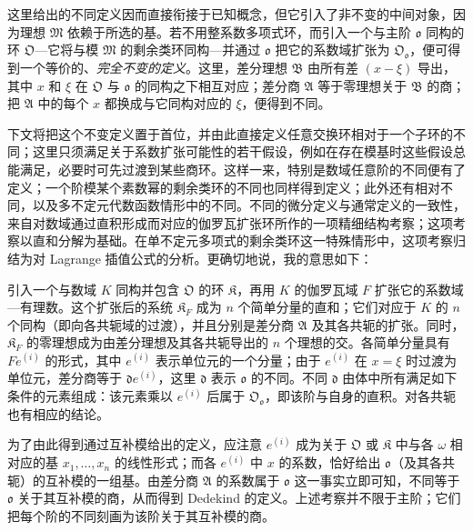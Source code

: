 这里给出的不同定义因而直接衔接于已知概念，但它引入了非不变的中间对象，因为理想 \(\mathfrak M\) 依赖于所选的基。若不用整系数多项式环，而引入一个与主阶 \(\mathfrak o\) 同构的环 \(\mathfrak O\)---它将与模 \(\mathfrak M\) 的剩余类环同构---并通过 \(\mathfrak o\) 把它的系数域扩张为 \(\mathfrak O_{\mathfrak o}\)，便可得到一个等价的、\emph{完全不变的定义}。这里，差分理想 \(\mathfrak B\) 由所有差 \((x-\xi)\) 导出，其中 \(x\) 和 \(\xi\) 在 \(\mathfrak O\) 与 \(\mathfrak o\) 的同构之下相互对应；差分商 \(\mathfrak A\) 等于零理想关于 \(\mathfrak B\) 的商；把 \(\mathfrak A\) 中的每个 \(x\) 都换成与它同构对应的 \(\xi\)，便得到不同。

下文将把这个不变定义置于首位，并由此直接定义任意交换环相对于一个子环的不同；这里只须满足关于系数扩张可能性的若干假设，例如在存在模基时这些假设总能满足，必要时可先过渡到某些商环。这样一来，特别是数域任意阶的不同便有了定义；一个阶模某个素数幂的剩余类环的不同也同样得到定义；此外还有相对不同，以及多不定元代数函数情形中的不同。不同的微分定义与通常定义的一致性，来自对数域通过直积形成而对应的伽罗瓦扩张环所作的一项精细结构考察；这项考察以直和分解为基础。在单不定元多项式的剩余类环这一特殊情形中，这项考察归结为对 Lagrange 插值公式的分析。更确切地说，我的意思如下：

引入一个与数域 \(K\) 同构并包含 \(\mathfrak O\) 的环 \(\mathfrak K\)，再用 \(K\) 的伽罗瓦域 \(F\) 扩张它的系数域---有理数。这个扩张后的系统 \(\mathfrak K_F\) 成为 \(n\) 个简单分量的直和；它们对应于 \(K\) 的 \(n\) 个同构（即向各共轭域的过渡），并且分别是差分商 \(\mathfrak A\) 及其各共轭的扩张。同时，\(\mathfrak K_F\) 的零理想成为由差分理想及其各共轭导出的 \(n\) 个理想的交。各简单分量具有 \(Fe^{(i)}\) 的形式，其中 \(e^{(i)}\) 表示单位元的一个分量；由于 \(e^{(i)}\) 在 \(x=\xi\) 时过渡为单位元，差分商等于 \(\mathfrak d e^{(i)}\)，这里 \(\mathfrak d\) 表示 \(\mathfrak o\) 的不同。不同 \(\mathfrak d\) 由体中所有满足如下条件的元素组成：该元素乘以 \(e^{(i)}\) 后属于 \(\mathfrak O_{\mathfrak o}\)，即该阶与自身的直积。对各共轭也有相应的结论。

为了由此得到通过互补模给出的定义，应注意 \(e^{(i)}\) 成为关于 \(\mathfrak O\) 或 \(\mathfrak K\) 中与各 \(\omega\) 相对应的基 \(x_1,\ldots,x_n\) 的线性形式；而各 \(e^{(i)}\) 中 \(x\) 的系数，恰好给出 \(\mathfrak o\)（及其各共轭）的互补模的一组基。由差分商 \(\mathfrak A\) 的系数属于 \(\mathfrak o\) 这一事实立即可知，不同等于 \(\mathfrak o\) 关于其互补模的商，从而得到 Dedekind 的定义。上述考察并不限于主阶；它们把每个阶的不同刻画为该阶关于其互补模的商。

